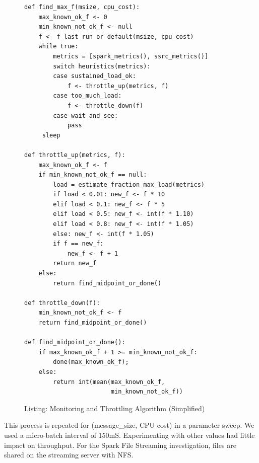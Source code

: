 \documentclass[conference]{IEEEtran}
\begin{document}
\begin{figure}
	\centering
\footnotesize
\begin{verbatim}
def find_max_f(msize, cpu_cost):
    max_known_ok_f <- 0
    min_known_not_ok_f <- null
    f <- f_last_run or default(msize, cpu_cost)
    while true:
        metrics = [spark_metrics(), ssrc_metrics()]
        switch heuristics(metrics):
        case sustained_load_ok: 
            f <- throttle_up(metrics, f)
        case too_much_load:
            f <- throttle_down(f)
        case wait_and_see:
            pass
     sleep

def throttle_up(metrics, f):
    max_known_ok_f <- f
    if min_known_not_ok_f == null:
        load = estimate_fraction_max_load(metrics)
        if load < 0.01: new_f <- f * 10
        elif load < 0.1: new_f <- f * 5
        elif load < 0.5: new_f <- int(f * 1.10)
        elif load < 0.8: new_f <- int(f * 1.05)
        else: new_f <- int(f * 1.05)
        if f == new_f:
            new_f <- f + 1
        return new_f
    else:
        return find_midpoint_or_done()

def throttle_down(f):
    min_known_not_ok_f <- f
    return find_midpoint_or_done()

def find_midpoint_or_done():
    if max_known_ok_f + 1 >= min_known_not_ok_f: 
        done(max_known_ok_f);
    else: 
        return int(mean(max_known_ok_f, 
                        min_known_not_ok_f))
\end{verbatim}
\normalsize
\caption{Listing: Monitoring and Throttling Algorithm (Simplified)}
\label{listing:throttle}
\end{figure}




This process is repeated for (message\_size, CPU cost) in a parameter sweep. 
We used a micro-batch interval of 150mS. Experimenting with other values had little impact on throughput. For the Spark File Streaming investigation, files are shared on the streaming server with NFS.%
\end{document}
